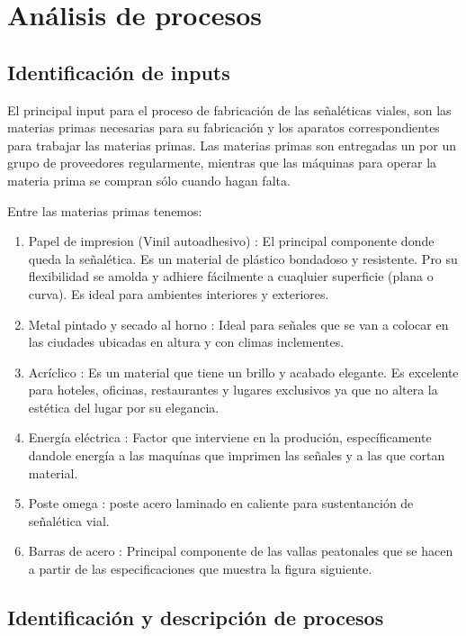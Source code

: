 \section{Análisis de procesos}
	\subsection{Identificación de inputs}

	El principal input para el proceso de fabricación de las señaléticas viales, son las materias primas necesarias para su fabricación y los aparatos correspondientes para trabajar las materias primas. Las materias primas son entregadas un por un grupo de proveedores regularmente, mientras que las máquinas para operar la materia prima se compran sólo cuando hagan falta.
	
	Entre las materias primas tenemos:
	
    \begin{enumerate}[1)]
    \item Papel de impresion (Vinil autoadhesivo) : El principal componente donde queda la señalética. Es un material de plástico bondadoso y resistente. Pro su flexibilidad se amolda y adhiere fácilmente a cuaqluier superficie (plana o curva). Es ideal para ambientes interiores y exteriores.
    \item Metal pintado y secado al horno : Ideal para señales que se van a colocar en las ciudades ubicadas en altura y con climas inclementes.
    \item Acríclico : Es un material que tiene un brillo y acabado elegante. Es excelente para hoteles, oficinas, restaurantes y lugares exclusivos ya que no altera la estética del lugar por su elegancia.
    \item Energía eléctrica : Factor que interviene en la produción, específicamente dandole energía a las maquínas que imprimen las señales y a las que cortan material.
    \item Poste omega :  poste acero laminado en caliente para sustentanción de señalética vial.
    \item Barras de acero : Principal componente de las vallas peatonales que se hacen a partir de las especificaciones que muestra la figura siguiente.
    \newpage
    \end{enumerate}
	\subsection{Identificación y descripción de procesos}

